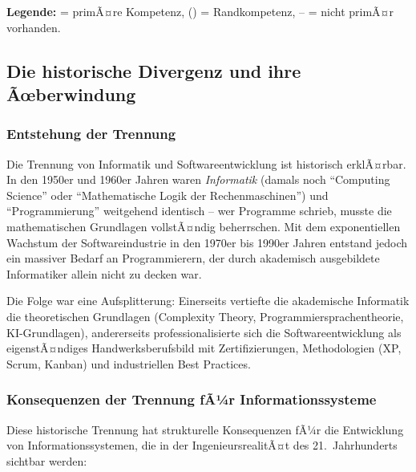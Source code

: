 ﻿\documentclass[a4paper,12pt]{article}
\theoremstyle{definition}
\begin{document}
\noindent
\textbf{Legende:} \checkmark = primÃ¤re Kompetenz, (\checkmark) = Randkompetenz, -- = nicht primÃ¤r vorhanden.

\subsection{Die historische Divergenz und ihre Ãœberwindung}

\subsubsection{Entstehung der Trennung}

Die Trennung von Informatik und Softwareentwicklung ist historisch erklÃ¤rbar. In den
1950er und 1960er Jahren waren \emph{Informatik} (damals noch \enquote{Computing Science}
oder \enquote{Mathematische Logik der Rechenmaschinen}) und \enquote{Programmierung}
weitgehend identisch -- wer Programme schrieb, musste die mathematischen Grundlagen
vollstÃ¤ndig beherrschen. Mit dem exponentiellen Wachstum der Softwareindustrie in
den 1970er bis 1990er Jahren entstand jedoch ein massiver Bedarf an Programmierern,
der durch akademisch ausgebildete Informatiker allein nicht zu decken war.

Die Folge war eine Aufsplitterung: Einerseits vertiefte die akademische Informatik die
theoretischen Grundlagen (Complexity Theory, Programmiersprachentheorie, KI-Grundlagen),
andererseits professionalisierte sich die Softwareentwicklung als eigenstÃ¤ndiges
Handwerksberufsbild mit Zertifizierungen, Methodologien (XP, Scrum, Kanban) und
industriellen Best Practices.

\subsubsection{Konsequenzen der Trennung fÃ¼r Informationssysteme}

Diese historische Trennung hat strukturelle Konsequenzen fÃ¼r die Entwicklung von
Informationssystemen, die in der IngenieursrealitÃ¤t des 21.~Jahrhunderts sichtbar werden:
\end{document}
